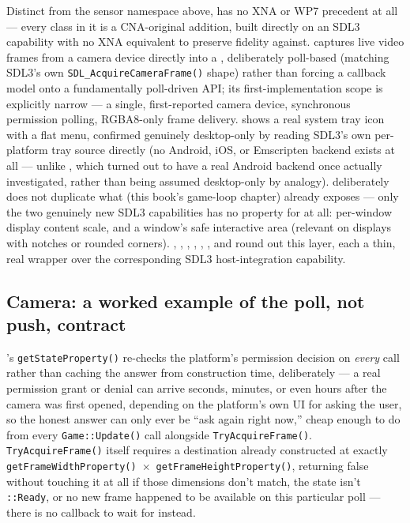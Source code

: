 Distinct from the sensor namespace above,  has no XNA or WP7 precedent at
all --- every class in it is a CNA-original addition, built directly on an SDL3 capability
with no XNA equivalent to preserve fidelity against.  captures live video
frames from a camera device directly into a , deliberately poll-based
(matching SDL3's own \texttt{SDL\_AcquireCameraFrame()} shape) rather than forcing a
callback model onto a fundamentally poll-driven API; its first-implementation scope is
explicitly narrow --- a single, first-reported camera device, synchronous permission
polling, RGBA8-only frame delivery.  shows a real system tray icon with
a flat menu, confirmed genuinely desktop-only by reading SDL3's own per-platform tray source
directly (no Android, iOS, or Emscripten backend exists at all --- unlike
, which turned out to have a real Android backend once actually
investigated, rather than being assumed desktop-only by analogy). 
deliberately does not duplicate what  (this book's game-loop chapter)
already exposes --- only the two genuinely new SDL3 capabilities
 has no property for at all: per-window display content scale, and a
window's safe interactive area (relevant on displays with notches or rounded corners).
, , , ,
, , and  round out this layer,
each a thin, real wrapper over the corresponding SDL3 host-integration capability.

\subsection{Camera: a worked example of the poll, not push, contract}

's \texttt{getStateProperty()} re-checks the platform's permission decision on
\emph{every} call rather than caching the answer from construction time, deliberately --- a
real permission grant or denial can arrive seconds, minutes, or even hours after the camera was
first opened, depending on the platform's own UI for asking the user, so the honest answer can
only ever be ``ask again right now,'' cheap enough to do from every \texttt{Game::Update()}
call alongside \texttt{TryAcquireFrame()}. \texttt{TryAcquireFrame()} itself requires a
destination  already constructed at exactly
\texttt{getFrameWidthProperty()}~$\times$~\texttt{getFrameHeightProperty()}, returning false
without touching it at all if those dimensions don't match, the state isn't
\texttt{::Ready}, or no new frame happened to be available on this
particular poll --- there is no callback to wait for instead.


